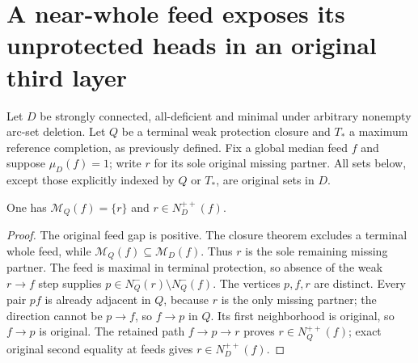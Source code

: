 \section{A near-whole feed exposes its unprotected heads in an original third layer}
\label{sec:nearwhole-feed-global-boundary-budget}

Let $D$ be strongly connected, all-deficient and minimal under arbitrary
nonempty arc-set deletion. Let $Q$ be a terminal weak protection closure
and $T_*$ a maximum reference completion, as previously defined. Fix a
global median feed $f$ and suppose $\mu_D(f)=1$; write $r$ for its sole
original missing partner. All sets below, except those explicitly indexed
by $Q$ or $T_*$, are original sets in $D$.

\begin{lemma}
\label{lem:weak-sole-partner-original-second}
One has $\mathcal M_Q(f)=\{r\}$ and $r\in N_D^{++}(f)$.
\end{lemma}
\begin{proof}
The original feed gap is positive. The closure theorem excludes
a terminal whole feed, while $\mathcal M_Q(f)\subseteq\mathcal M_D(f)$.
Thus $r$ is the sole remaining missing partner. The feed is maximal in
terminal protection, so absence of the weak $r\to f$ step supplies
$p\in N_Q^-(r)\setminus N_Q^-(f)$. The vertices $p,f,r$ are distinct.
Every pair $pf$ is already adjacent in $Q$, because $r$ is the only missing
partner; the direction cannot be $p\to f$, so $f\to p$ in $Q$.
Its first neighborhood is original, so $f\to p$ is original.
The retained path $f\to p\to r$ proves $r\in N_Q^{++}(f)$;
exact original second equality at feeds gives $r\in N_D^{++}(f)$.
\end{proof}

